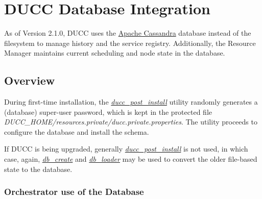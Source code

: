 % 
% 
% 
% 
\section{DUCC Database Integration}
\label{sec:ducc.database}

    As of Version 2.1.0, DUCC uses the \href{https://cassandra.apache.org/}{Apache Cassandra}
    database instead of the filesystem to manage
    history and the service registry.  Additionally, the Resource Manager maintains
    current scheduling and node state in the database.

   \subsection{Overview}

    During first-time installation, the \hyperref[subsec:admin.ducc-post-install]{\em ducc\_post\_install} utility
    randomly generates a (database) super-user password, which is kept in the protected file {\em DUCC\_HOME/resources.private/ducc.private.properties}.
    The utility proceeds to configure the database and install the schema.

    If DUCC is being upgraded, generally \hyperref[subsec:admin.ducc-post-intall]{\em ducc\_post\_install} is not used, in 
    which case, again, \hyperref[subsec:admin.db-create]{\em db\_create} and \hyperref[subsec:admin.db-loader]{\em db\_loader} may be used to
    convert the older file-based state to the database.

    \subsubsection{Orchestrator use of the Database}


